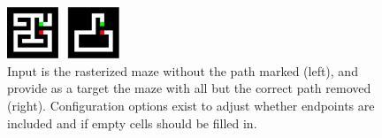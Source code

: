 \begin{figure}
	\centering
	\includegraphics[width=0.3\textwidth]{figures/maze-raster-input-target.pdf}
	\caption{
		Input is the rasterized maze without the path marked (left), and provide as a target the maze with all but the correct path removed (right). Configuration options exist to adjust whether endpoints are included and if empty cells should be filled in.
	}
	\label{fig:e2h-raster}
\end{figure}